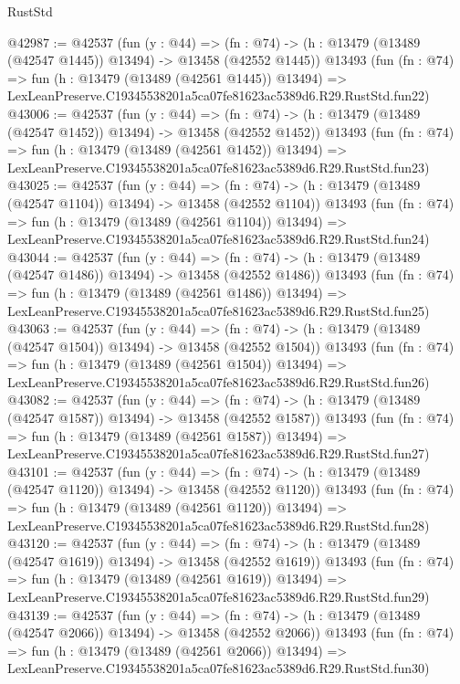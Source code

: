 \begin{lexlean}{RustStd}
\begin{coremodule}
@42987 := @42537
    (fun (y : @44) =>
    (fn : @74) -> (h : @13479 (@13489 (@42547 @1445)) @13494) -> @13458 (@42552 @1445))
    @13493
    (fun (fn : @74) =>
    fun (h : @13479 (@13489 (@42561 @1445)) @13494) =>
    LexLeanPreserve.C19345538201a5ca07fe81623ac5389d6.R29.RustStd.fun22)
@43006 := @42537
    (fun (y : @44) =>
    (fn : @74) -> (h : @13479 (@13489 (@42547 @1452)) @13494) -> @13458 (@42552 @1452))
    @13493
    (fun (fn : @74) =>
    fun (h : @13479 (@13489 (@42561 @1452)) @13494) =>
    LexLeanPreserve.C19345538201a5ca07fe81623ac5389d6.R29.RustStd.fun23)
@43025 := @42537
    (fun (y : @44) =>
    (fn : @74) -> (h : @13479 (@13489 (@42547 @1104)) @13494) -> @13458 (@42552 @1104))
    @13493
    (fun (fn : @74) =>
    fun (h : @13479 (@13489 (@42561 @1104)) @13494) =>
    LexLeanPreserve.C19345538201a5ca07fe81623ac5389d6.R29.RustStd.fun24)
@43044 := @42537
    (fun (y : @44) =>
    (fn : @74) -> (h : @13479 (@13489 (@42547 @1486)) @13494) -> @13458 (@42552 @1486))
    @13493
    (fun (fn : @74) =>
    fun (h : @13479 (@13489 (@42561 @1486)) @13494) =>
    LexLeanPreserve.C19345538201a5ca07fe81623ac5389d6.R29.RustStd.fun25)
@43063 := @42537
    (fun (y : @44) =>
    (fn : @74) -> (h : @13479 (@13489 (@42547 @1504)) @13494) -> @13458 (@42552 @1504))
    @13493
    (fun (fn : @74) =>
    fun (h : @13479 (@13489 (@42561 @1504)) @13494) =>
    LexLeanPreserve.C19345538201a5ca07fe81623ac5389d6.R29.RustStd.fun26)
@43082 := @42537
    (fun (y : @44) =>
    (fn : @74) -> (h : @13479 (@13489 (@42547 @1587)) @13494) -> @13458 (@42552 @1587))
    @13493
    (fun (fn : @74) =>
    fun (h : @13479 (@13489 (@42561 @1587)) @13494) =>
    LexLeanPreserve.C19345538201a5ca07fe81623ac5389d6.R29.RustStd.fun27)
@43101 := @42537
    (fun (y : @44) =>
    (fn : @74) -> (h : @13479 (@13489 (@42547 @1120)) @13494) -> @13458 (@42552 @1120))
    @13493
    (fun (fn : @74) =>
    fun (h : @13479 (@13489 (@42561 @1120)) @13494) =>
    LexLeanPreserve.C19345538201a5ca07fe81623ac5389d6.R29.RustStd.fun28)
@43120 := @42537
    (fun (y : @44) =>
    (fn : @74) -> (h : @13479 (@13489 (@42547 @1619)) @13494) -> @13458 (@42552 @1619))
    @13493
    (fun (fn : @74) =>
    fun (h : @13479 (@13489 (@42561 @1619)) @13494) =>
    LexLeanPreserve.C19345538201a5ca07fe81623ac5389d6.R29.RustStd.fun29)
@43139 := @42537
    (fun (y : @44) =>
    (fn : @74) -> (h : @13479 (@13489 (@42547 @2066)) @13494) -> @13458 (@42552 @2066))
    @13493
    (fun (fn : @74) =>
    fun (h : @13479 (@13489 (@42561 @2066)) @13494) =>
    LexLeanPreserve.C19345538201a5ca07fe81623ac5389d6.R29.RustStd.fun30)

\end{coremodule}
\end{lexlean}
